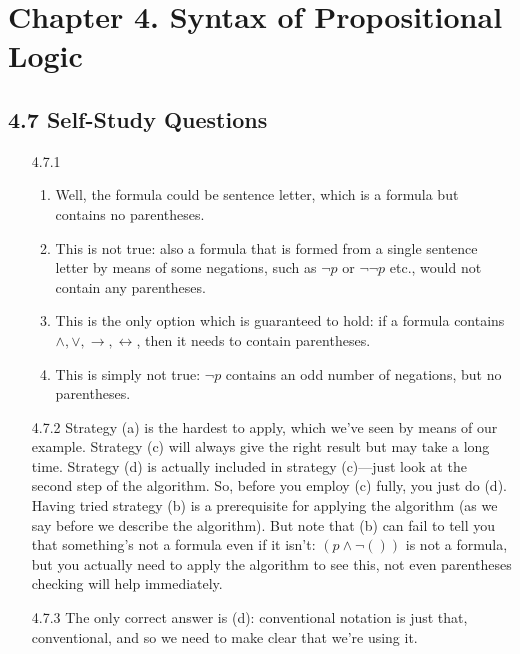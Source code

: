 \chapter{Chapter 4. Syntax of Propositional Logic}

\section*{4.7 Self-Study Questions}

	\begin{enumerate}
	
		\item[4.7.1]  
		
		\begin{enumerate}
		
			\item Well, the formula could be sentence letter, which is a formula but contains no parentheses.
			
			\item This is not true: also a formula that is formed from a single sentence letter by means of some negations, such as $\neg p$ or $\neg\neg p$ etc., would not contain any parentheses.
			
			\item This is the only option which is guaranteed to hold: if a formula contains $\land,\lor,\to,\leftrightarrow$, then it needs to contain parentheses.
			
			\item This is simply not true: $\neg p$ contains an odd number of negations, but no parentheses.
			
		\end{enumerate}
		
		\item[4.7.2] Strategy (a) is the hardest to apply, which we've seen by means of our example. Strategy (c) will always give the right result but may take a long time. Strategy (d) is actually included in strategy (c)---just look at the second step of the algorithm. So, before you employ (c) fully, you just do (d). Having tried strategy (b) is a prerequisite for applying the algorithm (as we say before we describe the algorithm). But note that (b) can fail to tell you that something's not a formula even if it isn't: $(p\land\neg())$ is not a formula, but you actually need to apply the algorithm to see this, not even parentheses checking will help immediately.
		
		\item[4.7.3] The only correct answer is (d): conventional notation is just that, conventional, and so we need to make clear that we're using it.
		

\end{enumerate}
